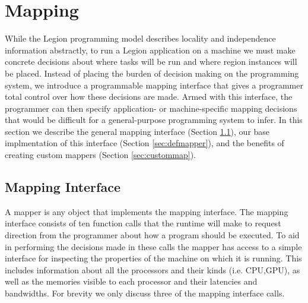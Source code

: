 \section{Mapping}
\label{sec:mapping}

While the Legion programming model describes locality and independence information abstractly,
to run a Legion application on a machine we must make concrete decisions about
where tasks will be run and where region instances will be placed.  Instead of placing
the burden of decision making on the programming system, we introduce a programmable mapping
interface that gives a programmer total control over how these decisions are made.  Armed
with this interface, the programmer can then specify application- or machine-specific
mapping decisions that would be difficult for a general-purpose programming system to infer.
In this section we describe the general mapping interface (Section \ref{sec:mapinterface}),
our base implmentation of this interface (Section \ref{sec:defmapper}), and the benefits
of creating custom mappers (Section \ref{sec:custommap}).

\subsection{Mapping Interface}
\label{sec:mapinterface}
A mapper is any object that implements the mapping interface.  The mapping interface
consists of ten function calls that the runtime will make to request direction from
the programmer about how a program should be executed.  To aid in performing the 
decisions made in these calls the mapper has access to a simple 
interface for inspecting the properties of the machine on which it is running.  This includes 
information about all the processors and their kinds (i.e. CPU,GPU), as well as the memories visible
to each processor and their latencies and bandwidths.  For brevity we only
discuss three of the mapping interface calls.

